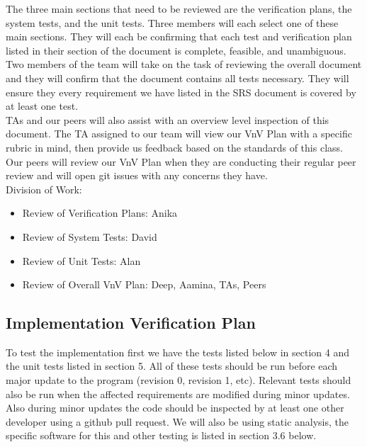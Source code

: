 \documentclass[12pt, titlepage]{article}
\begin{document}
The three main sections that need to be reviewed are the verification plans, the system tests, 
and the unit tests. Three members will each select one of these main sections. They will each be 
confirming that each test and verification plan listed in their section of the document is complete, 
feasible, and unambiguous.\\

Two members of the team will take on the task of reviewing the overall document and they will 
confirm that the document contains all tests necessary. They will ensure they every requirement we 
have listed in the SRS document is covered by at least one test.\\

TAs and our peers will also assist with an overview level inspection of this document. The TA 
assigned to our team will view our VnV Plan with a specific rubric in mind, then provide us feedback 
based on the standards of this class. Our peers will review our VnV Plan when they are conducting 
their regular peer review and will open git issues with any concerns they have.\\

\noindent Division of Work:

\begin{itemize}
  \item Review of Verification Plans: Anika
  \item Review of System Tests: David
  \item Review of Unit Tests: Alan
  \item Review of Overall VnV Plan: Deep, Aamina, TAs, Peers
\end{itemize}



\subsection{Implementation Verification Plan}

To test the implementation first we have the tests listed below in section 4 and the unit tests listed in section 5. 
All of these tests should be run before each major update to the program (revision 0, revision 1, etc). Relevant tests should
also be run when the affected requirements are modified during minor updates. Also during minor updates the code should be 
inspected by at least one other developer using a github pull request. We will also be using static analysis, the specific 
software for this and other testing is listed in section 3.6 below.
\end{document}
